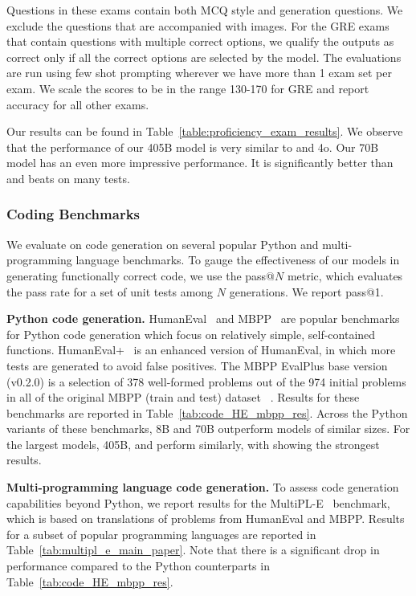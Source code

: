 \documentclass[dvipsnames]{fairmeta}
\begin{document}
Questions in these exams contain both MCQ style and generation questions.
We exclude the questions that are accompanied with images.
For the GRE exams that contain questions with multiple correct options, we qualify the outputs as correct only if all the correct options are selected by the model.
The evaluations are run using few shot prompting wherever we have more than 1 exam set per exam. We scale the scores to be in the range 130-170 for GRE and report accuracy for all other exams.

Our results can be found in Table~\ref{table:proficiency_exam_results}. We observe that the performance of our \llamathree 405B model is very similar to \sonnet and \gpt4o. Our 70B model has an even more impressive performance. It is significantly better than \gptthreedotfivet and beats \nemotron on many tests.

\subsubsection{Coding Benchmarks}
\label{subsubsec:code_evals}
We evaluate \llamathree on code generation on several popular Python and multi-programming language benchmarks.
To gauge the effectiveness of our models in generating functionally correct code, we use the pass@$N$ metric, which evaluates the pass rate for a set of unit tests among $N$ generations. We report pass@1.

\textbf{Python code generation.} HumanEval~\citep{chen2021evaluating} and  MBPP~\citep{austin2021program} are popular benchmarks for Python code generation which focus on relatively simple, self-contained functions.
HumanEval+~\citep{liu2024your} is an enhanced version of HumanEval, in which more tests are generated to avoid false positives. The MBPP EvalPlus base version (v0.2.0) is a selection of 378 well-formed problems out of the 974 initial problems in all of the original MBPP (train and test) dataset ~\citep{liu2024your}.
Results for these benchmarks are reported in Table~\ref{tab:code_HE_mbpp_res}.
Across the Python variants of these benchmarks, \llamathree 8B and 70B outperform models of similar sizes. For the largest models, \llamathree 405B, \sonnet and \gpto perform similarly, with \gpto showing the strongest results. 

\textbf{Multi-programming language code generation.} To assess code generation capabilities beyond Python, we report results for the MultiPL-E~\citep{cassano2022multiple} benchmark, which is based on translations of problems from HumanEval and MBPP.
Results for a subset of popular programming languages are reported in Table~\ref{tab:multipl_e_main_paper}. Note that there is a significant drop in performance compared to the Python counterparts in Table~\ref{tab:code_HE_mbpp_res}.
\end{document}
